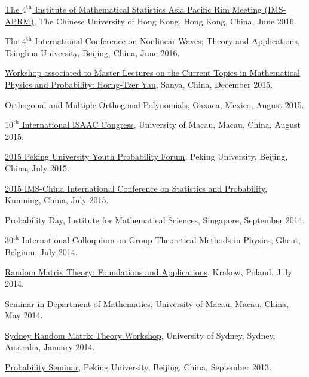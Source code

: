 \begin{item_list}
\item
  \href{http://ims-aprm2016.sta.cuhk.edu.hk/}{The $4^{\text{th}}$ Institute of Mathematical Statistics Asia Pacific Rim Meeting (IMS-APRM)}, The Chinese University of Hong Kong, Hong Kong, China, June 2016.
\item
  \href{http://icnwta4.csp.escience.cn/dct/page/1}{The $4^{\text{th}}$ International Conference on Nonlinear Waves: Theory and Applications}, Tsinghua University, Beijing, China, June 2016.
\item
  \href{http://ymsc.tsinghua.edu.cn/sanya/2016/MHTY2016/synopsis_and_organizers.aspx}{Workshop associated to Master Lectures on the Current Topics in Mathematical Physics and Probability: Horng-Tzer Yau}, Sanya, China, December 2015.
\item
  \href{http://www.birs.ca/events/2015/5-day-workshops/15w5022}{Orthogonal and Multiple Orthogonal Polynomials}, Oaxaca, Mexico, August 2015.
\item
  \href{http://www.fst.umac.mo/conference/isaac2015/}{$10^{\text{th}}$ International ISAAC Congress}, University of Macau, Macau, China, August 2015.
\item
  \href{http://www.math.pku.edu.cn/teachers/liuyong/2015forum/admin/html/default.php}{2015 Peking University Youth Probability Forum}, Peking University, Beijing, China, July 2015.
\item
  \href{http://www.2015imschina.com/}{2015 IMS-China International Conference on Statistics and Probability}, Kunming, China, July 2015.
\item
  Probability Day, Institute for Mathematical Sciences, Singapore, September 2014.
\item \href{http://th-www.if.uj.edu.pl/~matrix2014/index.html}{$30^{\text{th}}$ International Colloquium on Group Theoretical Methods in Physics}, Ghent, Belgium, July 2014.
\item
  \href{http://th-www.if.uj.edu.pl/~matrix2014/index.html}{Random Matrix Theory: Foundations and Applications}, Krakow, Poland, July 2014.
\item
  Seminar in Department of Mathematics, University of Macau, Macau, China, May 2014.
\item
  \href{http://www.maths.usyd.edu.au/u/olver/conferences/RMT.html}{Sydney Random Matrix Theory Workshop}, University of Sydney, Sydney, Australia, January 2014. 
\item
  \href{http://www.math.pku.edu.cn/teachers/liuyong/seminarC.htm}{Probability Seminar}, Peking University, Beijing, China, September 2013.

\end{item_list}
